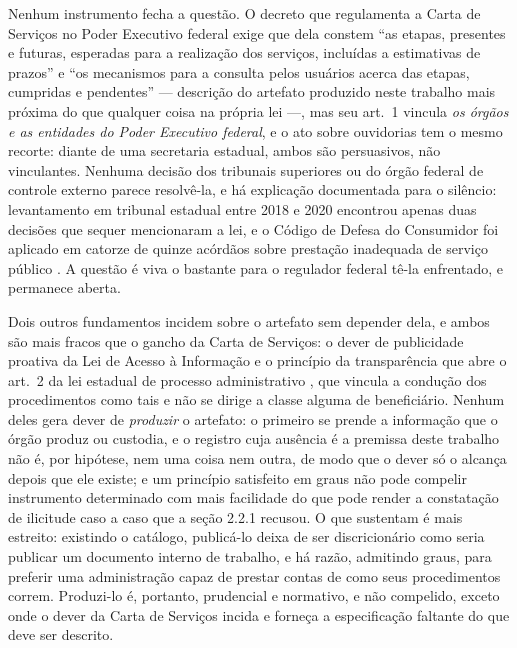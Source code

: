 Nenhum instrumento fecha a questão. O decreto que regulamenta a Carta de Serviços no Poder Executivo
federal exige que dela constem ``as etapas, presentes e futuras, esperadas para a realização dos
serviços, incluídas a estimativas de prazos'' e ``os mecanismos para a consulta pelos usuários
acerca das etapas, cumpridas e pendentes''
\cite[art.~11, \S~3\textordmasculine{}]{brbrasil2017decreto9094} --- descrição do artefato produzido
neste trabalho mais próxima do que qualquer coisa na própria lei ---, mas seu
art.~1\textordmasculine{} vincula \emph{os órgãos e as entidades do Poder Executivo federal}, e o
ato sobre ouvidorias tem o mesmo recorte: diante de uma secretaria estadual, ambos são persuasivos,
não vinculantes. Nenhuma decisão dos tribunais superiores ou do órgão federal de controle externo
parece resolvê-la, e há explicação documentada para o silêncio: levantamento em tribunal estadual
entre 2018 e 2020 encontrou apenas duas decisões que sequer mencionaram a lei, e o Código de Defesa
do Consumidor foi aplicado em catorze de quinze acórdãos sobre prestação inadequada de serviço
público \cite{brjuruena2021usuario}. A questão é viva o bastante para o regulador federal tê-la
enfrentado, e permanece aberta.

Dois outros fundamentos incidem sobre o artefato sem depender dela, e ambos são mais fracos que o
gancho da Carta de Serviços: o dever de publicidade proativa da Lei de Acesso à Informação
\cite{brasil2011lai} e o princípio da transparência que abre o art.~2\textordmasculine{} da lei
estadual de processo administrativo \cite{state2016procedurelaw}, que vincula a condução dos
procedimentos como tais e não se dirige a classe alguma de beneficiário. Nenhum deles gera dever de
\emph{produzir} o artefato: o primeiro se prende a informação que o órgão produz ou custodia, e o
registro cuja ausência é a premissa deste trabalho não é, por hipótese, nem uma coisa nem outra, de
modo que o dever só o alcança depois que ele existe; e um princípio satisfeito em graus não pode
compelir instrumento determinado com mais facilidade do que pode render a constatação de ilicitude
caso a caso que a seção 2.2.1 recusou. O que sustentam é mais estreito: existindo o catálogo,
publicá-lo deixa de ser discricionário como seria publicar um documento interno de trabalho, e há
razão, admitindo graus, para preferir uma administração capaz de prestar contas de como seus
procedimentos correm. Produzi-lo é, portanto, prudencial e normativo, e não compelido, exceto onde o
dever da Carta de Serviços incida e forneça a especificação faltante do que deve ser descrito.

